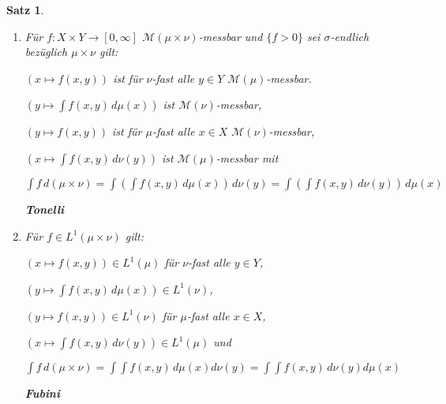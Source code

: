 \documentclass[11pt]{memoir}
\theoremstyle{changebreak}
\newtheorem{Satz}{Satz}[chapter]
\begin{document}
\begin{Satz}
\begin{enumerate}
	\item Für $f: X \times Y \rightarrow [0, \infty]$ $\mathscr M(\mu \times \nu)$-messbar und $\{f > 0\}$ sei $\sigma$-endlich bezüglich $\mu \times \nu$ gilt:
	\par
	$(x \mapsto f(x, y))$ ist für $\nu$-fast alle $y \in Y$ $\mathscr M(\mu)$-messbar.
	\par
	$\left(y \mapsto \int f(x, y) \, d\mu(x)\right) $ ist $\mathscr M(\nu)$-messbar,
	\par
	$(y \mapsto f(x, y))$ ist für $\mu$-fast alle $x \in X$ $\mathscr M(\nu)$-messbar,
	\par
	$\left( x \mapsto \int f(x, y) \, d\nu(y)\right)$ ist $\mathscr M(\mu)$-messbar mit
	\begin{center}
		$\int f \, d(\mu \times \nu) = \int \left( \int f(x, y) \, d\mu(x) \right) \, d\nu(y) = \int \left( \int f(x, y) \, d\nu(y) \right) \, d\mu(x)$ \\
	\end{center}
	\emph{\textbf{Tonelli}}

	\item Für $f \in L^1(\mu \times \nu)$ gilt:
	\par
	$(x \mapsto f(x, y)) \in L^1(\mu)$ für $\nu$-fast alle $y \in Y$,
	\par
	$(y \mapsto \int f(x, y)\, d\mu(x)) \in L^1(\nu)$,
	\par
	$(y \mapsto f(x, y)) \in L^1(\nu)$ für $\mu$-fast alle $x \in X$,
	\par
	$(x \mapsto \int f(x, y) \, d\nu(y)) \in L^1(\mu)$ und
	\begin{center}
		$\int f \, d(\mu \times \nu) = \int \int f(x, y) \, d\mu(x)d\nu(y) = \int \int f(x, y) \, d\nu(y)d\mu(x)$
	\end{center}
	\emph{\textbf{Fubini}}
\end{enumerate}
\end{Satz}
\end{document}
